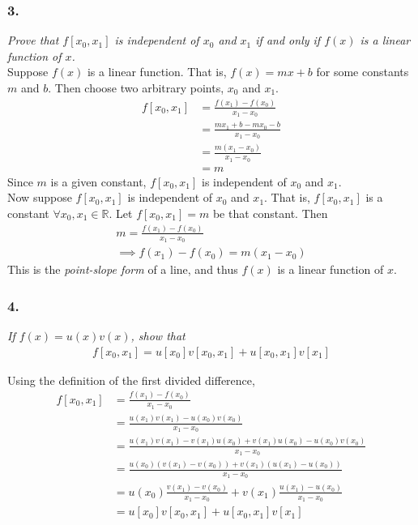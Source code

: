 \documentclass[12pt]{article}
\begin{document}
\subsubsection*{3.}

{\it Prove that $f[x_0, x_1]$ is independent of $x_0$ and $x_1$ if and only if $f(x)$ is a linear function of $x$.} \\

\noindent Suppose $f(x)$ is a linear function.  That is, $f(x) = mx + b$ for some constants $m$ and $b$.  Then choose two arbitrary points, $x_0$ and $x_1$.
\begin{align*}
f[x_0, x_1] &= \frac{f(x_1) - f(x_0)}{x_1 - x_0} \\
&= \frac{mx_1 + b - mx_0 - b}{x_1 - x_0} \\
&= \frac{m(x_1 - x_0)}{x_1 - x_0} \\
&= m
\end{align*}
Since $m$ is a given constant, $f[x_0, x_1]$ is independent of $x_0$ and $x_1$. \\

\noindent Now suppose $f[x_0, x_1]$ is independent of $x_0$ and $x_1$.  That is, $f[x_0, x_1]$ is a constant $\forall x_0, x_1 \in \mathbb{R}$.  Let $f[x_0, x_1] = m$ be that constant.  Then
\begin{align*}
m = \frac{f(x_1) - f(x_0)}{x_1 - x_0} \\
\implies f(x_1) - f(x_0) = m(x_1 - x_0)
\end{align*}
This is the {\it point-slope form} of a line, and thus $f(x)$ is a linear function of $x$.

\subsubsection*{4.}

{\it If $f(x) = u(x)v(x)$, show that}
\begin{align*}
f[x_0, x_1] = u[x_0]v[x_0, x_1] + u[x_0, x_1]v[x_1]
\end{align*}

\noindent Using the definition of the first divided difference, 
\begin{align*}
f[x_0, x_1] &= \frac{f(x_1) - f(x_0)}{x_1 - x_0} \\[.1cm]
&= \frac{u(x_1)v(x_1) - u(x_0)v(x_0)}{x_1 - x_0} \\[.1cm]
&= \frac{u(x_1)v(x_1) - v(x_1)u(x_0) + v(x_1)u(x_0) - u(x_0)v(x_0)}{x_1 - x_0} \\[.1cm]
&= \frac{u(x_0)(v(x_1) - v(x_0)) + v(x_1)(u(x_1) - u(x_0))}{x_1 - x_0} \\[.1cm]
&= u(x_0)\frac{v(x_1) - v(x_0)}{x_1 - x_0} + v(x_1)\frac{u(x_1) - u(x_0)}{x_1 - x_0} \\[.1cm]
&= u[x_0]v[x_0, x_1] + u[x_0, x_1]v[x_1]
\end{align*}
\end{document}
